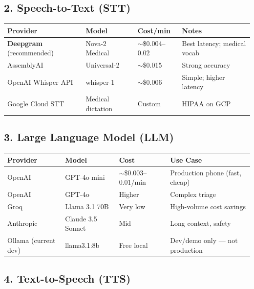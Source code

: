 \documentclass[11pt,a4paper]{article}
\begin{document}
\subsection{2. Speech-to-Text (STT)}

\begin{center}
\small
\begin{tabular}{@{}llll@{}}
\toprule
\textbf{Provider} & \textbf{Model} & \textbf{Cost/min} & \textbf{Notes} \\
\midrule
\textbf{Deepgram} (recommended) & Nova-2 Medical & $\sim$\$0.004--0.02 & Best latency; medical vocab \\
AssemblyAI & Universal-2 & $\sim$\$0.015 & Strong accuracy \\
OpenAI Whisper API & whisper-1 & $\sim$\$0.006 & Simple; higher latency \\
Google Cloud STT & Medical dictation & Custom & HIPAA on GCP \\
\bottomrule
\end{tabular}
\end{center}

\subsection{3. Large Language Model (LLM)}

\begin{center}
\small
\begin{tabular}{@{}llll@{}}
\toprule
\textbf{Provider} & \textbf{Model} & \textbf{Cost} & \textbf{Use Case} \\
\midrule
OpenAI & GPT-4o mini & $\sim$\$0.003--0.01/min & Production phone (fast, cheap) \\
OpenAI & GPT-4o & Higher & Complex triage \\
Groq & Llama 3.1 70B & Very low & High-volume cost savings \\
Anthropic & Claude 3.5 Sonnet & Mid & Long context, safety \\
Ollama (current dev) & llama3.1:8b & Free local & Dev/demo only --- not production \\
\bottomrule
\end{tabular}
\end{center}

\subsection{4. Text-to-Speech (TTS)}
\end{document}
